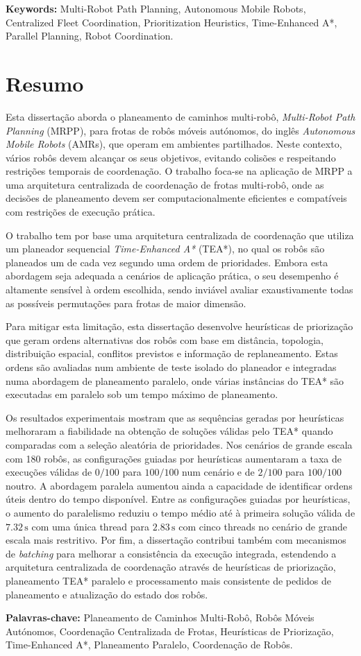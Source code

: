 \vfill

\noindent\textbf{Keywords:} Multi-Robot Path Planning, Autonomous Mobile Robots,
Centralized Fleet Coordination, Prioritization Heuristics, Time-Enhanced A*,
Parallel Planning, Robot Coordination.



\chapter*{Resumo}
\hspace{\parindent}
Esta dissertação aborda o planeamento de caminhos multi-robô, \emph{Multi-Robot Path Planning} (MRPP), para frotas de robôs móveis autónomos, do inglês \emph{Autonomous Mobile Robots} (AMRs), que operam em ambientes partilhados. Neste contexto, vários robôs devem alcançar os seus objetivos, evitando colisões e respeitando restrições temporais de coordenação. O trabalho foca-se na aplicação de MRPP a uma arquitetura centralizada de coordenação de frotas multi-robô, onde as decisões de planeamento devem ser computacionalmente eficientes e compatíveis com restrições de execução prática.

O trabalho tem por base uma arquitetura centralizada de coordenação que utiliza um planeador sequencial \emph{Time-Enhanced A*} (TEA*), no qual os robôs são planeados um de cada vez segundo uma ordem de prioridades. Embora esta abordagem seja adequada a cenários de aplicação prática, o seu desempenho é altamente sensível à ordem escolhida, sendo inviável avaliar exaustivamente todas as possíveis permutações para frotas de maior dimensão.

Para mitigar esta limitação, esta dissertação desenvolve heurísticas de priorização que geram ordens alternativas dos robôs com base em distância, topologia, distribuição espacial, conflitos previstos e informação de replaneamento. Estas ordens são avaliadas num ambiente de teste isolado do planeador e integradas numa abordagem de planeamento paralelo, onde várias instâncias do TEA* são executadas em paralelo sob um tempo máximo de planeamento.

Os resultados experimentais mostram que as sequências geradas por heurísticas melhoraram a
fiabilidade na obtenção de soluções válidas pelo TEA* quando comparadas com a seleção aleatória
de prioridades. Nos cenários de grande escala com 180 robôs, as configurações guiadas por
heurísticas aumentaram a taxa de execuções válidas de \(0/100\) para \(100/100\) num cenário e
de \(2/100\) para \(100/100\) noutro. A abordagem paralela aumentou ainda a capacidade de
identificar ordens úteis dentro do tempo disponível. Entre as configurações guiadas por heurísticas,
o aumento do paralelismo reduziu o tempo médio até à primeira solução válida de \(7.32\,\mathrm{s}\)
com uma única thread para \(2.83\,\mathrm{s}\) com cinco threads no cenário de grande escala mais
restritivo. Por fim, a dissertação contribui também com mecanismos de \textit{batching} para
melhorar a consistência da execução integrada, estendendo a arquitetura centralizada de coordenação
através de heurísticas de priorização, planeamento TEA* paralelo e processamento mais consistente
de pedidos de planeamento e atualização do estado dos robôs.

\vfill
\noindent\textbf{Palavras-chave:} Planeamento de Caminhos Multi-Robô, Robôs Móveis Autónomos,
Coordenação Centralizada de Frotas, Heurísticas de Priorização, Time-Enhanced A*,
Planeamento Paralelo, Coordenação de Robôs.